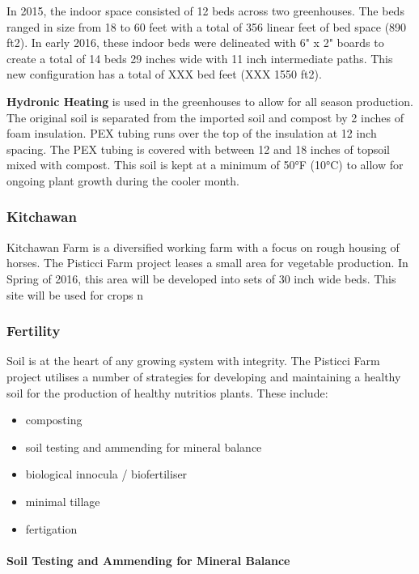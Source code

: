In 2015, the indoor space consisted of 12 beds across two greenhouses.
The beds ranged in size from 18 to 60 feet with a total of 356 linear
feet of bed space (890 ft2). In early 2016, these indoor beds were
delineated with 6" x 2" boards to create a total of 14 beds 29 inches
wide with 11 inch intermediate paths. This new configuration has a total
of XXX bed feet (XXX 1550 ft2).

\textbf{Hydronic Heating} is used in the greenhouses to allow for all
season production. The original soil is separated from the imported soil
and compost by 2 inches of foam insulation. PEX tubing runs over the top
of the insulation at 12 inch spacing. The PEX tubing is covered with
between 12 and 18 inches of topsoil mixed with compost. This soil is
kept at a minimum of 50°F (10°C) to allow for ongoing plant growth
during the cooler month.

\subsubsection{Kitchawan}\label{kitchawan}

Kitchawan Farm is a diversified working farm with a focus on rough
housing of horses. The Pisticci Farm project leases a small area for
vegetable production. In Spring of 2016, this area will be developed
into sets of 30 inch wide beds. This site will be used for crops n

\subsubsection{Fertility}\label{fertility}

Soil is at the heart of any growing system with integrity. The Pisticci
Farm project utilises a number of strategies for developing and
maintaining a healthy soil for the production of healthy nutritios
plants. These include:

\begin{itemize}
\itemsep1pt\parskip0pt
\item
  composting
\item
  soil testing and ammending for mineral balance
\item
  biological innocula / biofertiliser
\item
  minimal tillage
\item
  fertigation
\end{itemize}

\paragraph{Soil Testing and Ammending for Mineral
Balance}\label{soil-testing-and-ammending-for-mineral-balance}

